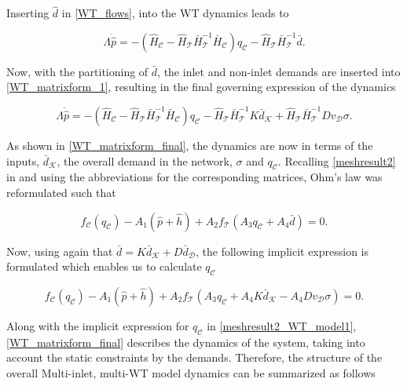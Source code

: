 Inserting $\hat{d}$ in \eqref{WT_flows}, into the WT dynamics leads to

\begin{equation}
\label{WT_matrixform_1}
\Lambda \dot{\hat{p}} = - (\hat{H}_{\mathcal{C}} - \hat{H}_{\mathcal{T}} \bar{H}^{-1}_{\mathcal{T}}\bar{H}_{\mathcal{C}})  q_\mathcal{C}  - \hat{H}_{\mathcal{T}} \bar{H}^{-1}_{\mathcal{T}} \bar{d}.
\end{equation}

Now, with the partitioning of $\bar{d}$, the inlet and non-inlet demands are inserted into \eqref{WT_matrixform_1}, resulting in the final governing expression of the dynamics

\begin{equation}
\label{WT_matrixform_final}
\Lambda \dot{\hat{p}} = - (\hat{H}_{\mathcal{C}} - \hat{H}_{\mathcal{T}} \bar{H}^{-1}_{\mathcal{T}}\bar{H}_{\mathcal{C}})  q_\mathcal{C}  - \hat{H}_{\mathcal{T}} \bar{H}^{-1}_{\mathcal{T}} K \bar{d}_{\mathcal{K}} + \hat{H}_{\mathcal{T}} \bar{H}^{-1}_{\mathcal{T}} D v_{\mathcal{D}} \sigma .
\end{equation}

As shown in \eqref{WT_matrixform_final}, the dynamics are now in terms of the inputs, $\bar{d}_{\mathcal{K}}$, the overall demand in the network, $\sigma$ and $q_\mathcal{C}$. Recalling \eqref{meshresult2} in  and using the abbreviations for the corresponding matrices, Ohm's law was reformulated such that

 \begin{equation}
\label{meshresult2_WT_model}
f_{\mathcal{C}}(q_\mathcal{C}) -A_1(\hat{p} + \hat{h}) + A_2 f_{\mathcal{T}}(A_3 q_\mathcal{C} + A_4 \bar{d}) = 0.
\end{equation} 

Now, using again that $\bar{d} = K \bar{d}_{\mathcal{K}} + D \bar{d}_{\mathcal{D}}$, the following implicit expression is formulated which enables us to calculate $q_\mathcal{C}$

 \begin{equation}
\label{meshresult2_WT_model1}
f_{\mathcal{C}}(q_\mathcal{C}) - A_1(\hat{p} + \hat{h}) + A_2 f_{\mathcal{T}}(A_3 q_\mathcal{C} + A_4 K \bar{d}_{\mathcal{K}} - A_4 D v_{\mathcal{D}} \sigma) = 0.
\end{equation} 

Along with the implicit expression for $q_\mathcal{C}$ in \eqref{meshresult2_WT_model1}, \eqref{WT_matrixform_final} describes the dynamics of the system, taking into account the static constraints by the demands. Therefore, the structure of the overall Multi-inlet, multi-WT model dynamics can be summarized as follows

